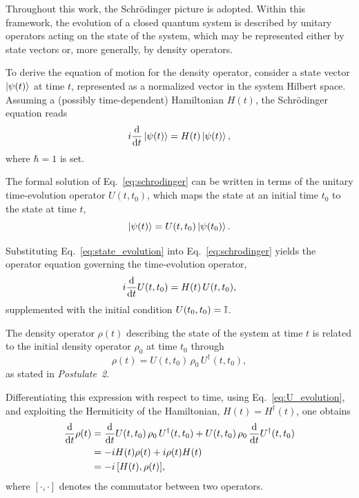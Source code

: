 Throughout this work, the Schrödinger picture is adopted.
Within this framework, the evolution of a closed quantum system is described by unitary operators acting on the state of the system, which may be represented either by state vectors or, more generally, by density operators.

To derive the equation of motion for the density operator, consider a state vector $\ket{\psi(t)}$ at time $t$, represented as a normalized vector in the system Hilbert space.
Assuming a (possibly time-dependent) Hamiltonian $H(t)$, the Schrödinger equation reads
\begin{equation}
    \label{eq:schrodinger}
    i \dv{t} \ket{\psi(t)} = H(t)\ket{\psi(t)},
\end{equation}
where $\hbar = 1$ is set.

The formal solution of Eq.~\eqref{eq:schrodinger} can be written in terms of the unitary time-evolution operator $U(t,t_0)$, which maps the state at an initial time $t_0$ to the state at time $t$,
\begin{equation}
    \label{eq:state_evolution}
    \ket{\psi(t)} = U(t,t_0)\ket{\psi(t_0)}.
\end{equation}

Substituting Eq.~\eqref{eq:state_evolution} into Eq.~\eqref{eq:schrodinger} yields the operator equation governing the time-evolution operator,
\begin{equation}
    \label{eq:U_evolution}
    i \dv{t} U(t,t_0) = H(t)\, U(t,t_0),
\end{equation}
supplemented with the initial condition $U(t_0,t_0)=\mathbb{I}$.

The density operator $\rho(t)$ describing the state of the system at time $t$ is related to the initial density operator $\rho_0$ at time $t_0$ through
\begin{equation}
    \rho(t) = U(t,t_0)\,\rho_0\,U^{\dagger}(t,t_0),
\end{equation}
as stated in \textit{Postulate~2}.

Differentiating this expression with respect to time, using Eq.~\eqref{eq:U_evolution}, and exploiting the Hermiticity of the Hamiltonian, $H(t)=H^{\dagger}(t)$, one obtains
\begin{align}
    \dv{t} \rho(t)
     & = \dv{t} U(t,t_0) \,\rho_0\,U^{\dagger}(t,t_0)
    + U(t,t_0)\,\rho_0\,\dv{t} U^{\dagger}(t,t_0) \nonumber \\
     & = -i H(t)\rho(t) + i \rho(t)H(t) \nonumber           \\
     & = -i\,[H(t),\rho(t)], \label{eq:von_neumann}
\end{align}
where $[\cdot,\cdot]$ denotes the commutator between two operators.

